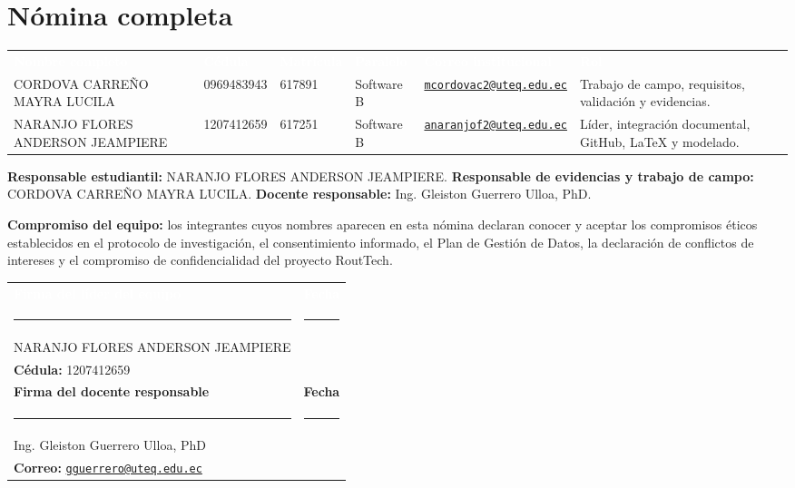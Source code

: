 \documentclass[11pt,a4paper]{article}
\makeatletter
\newcommand{\Mayra}{CORDOVA CARREÑO MAYRA LUCILA}
\newcommand{\Anderson}{NARANJO FLORES ANDERSON JEAMPIERE}
\newcommand{\Docente}{Ing. Gleiston Guerrero Ulloa, PhD}
\newcommand{\CorreoDocente}{gguerrero@uteq.edu.ec}
\makeatother
\begin{document}
\section{Nómina completa}

\scriptsize
{}
\noindent\begin{tabularx}{\textwidth}{@{}L{3.45cm} C{1.75cm} C{1.45cm} C{1.80cm} L{3.25cm} Y@{}}
\textcolor{white}{\textbf{Nombre completo}} &
\textcolor{white}{\textbf{Cédula}} &
\textcolor{white}{\textbf{Matrícula}} &
\textcolor{white}{\textbf{Paralelo}} &
\textcolor{white}{\textbf{Correo institucional}} &
\textcolor{white}{\textbf{Rol}}\\
\Mayra & 0969483943 & 617891 & Software B & \href{mailto:mcordovac2@uteq.edu.ec}{\nolinkurl{mcordovac2@uteq.edu.ec}} & Trabajo de campo, requisitos, validación y evidencias.\\
\Anderson & 1207412659 & 617251 & Software B & \href{mailto:anaranjof2@uteq.edu.ec}{\nolinkurl{anaranjof2@uteq.edu.ec}} & Líder, integración documental, GitHub, LaTeX y modelado.\\
\end{tabularx}
\normalsize

\vspace{0.35cm}
\textbf{Responsable estudiantil:} \Anderson. \textbf{Responsable de evidencias y trabajo de campo:} \Mayra. \textbf{Docente responsable:} \Docente.

\vspace{0.25cm}
\textbf{Compromiso del equipo:} los integrantes cuyos nombres aparecen en esta nómina declaran conocer y aceptar los compromisos éticos establecidos en el protocolo de investigación, el consentimiento informado, el Plan de Gestión de Datos, la declaración de conflictos de intereses y el compromiso de confidencialidad del proyecto RoutTech.

\vspace{0.55cm}
\noindent\begin{tabularx}{\textwidth}{@{}Y C{4.7cm}@{}}
\textcolor{white}{\textbf{Firma del líder del equipo}} & \textcolor{white}{\textbf{Fecha}}\\[0.55cm]
\rule{7.0cm}{0.4pt} & \rule{3.3cm}{0.4pt}\\[-1pt]
\Anderson & \\
\textbf{Cédula:} 1207412659 & \\
\addlinespace[0.35cm]
\textbf{Firma del docente responsable} & \textbf{Fecha}\\[0.55cm]
\rule{7.0cm}{0.4pt} & \rule{3.3cm}{0.4pt}\\[-1pt]
\Docente & \\
\textbf{Correo:} \href{mailto:\CorreoDocente}{\nolinkurl{\CorreoDocente}} & \\
\end{tabularx}
\end{document}
